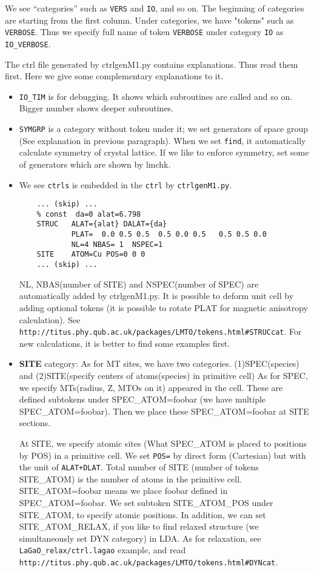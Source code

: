 \documentclass[a4paper,10pt,epsf,fleqn]{article}
\begin{document}
We see ``categories'' such as \verb+VERS+ and \verb+IO+, and so on.
The beginning of categories are starting from the first column.
Under categories, we have "tokens" such as \verb+VERBOSE+.
Thus we specify full name of token \verb+VERBOSE+ under category
\verb+IO+ as \verb+IO_VERBOSE+.

The ctrl file generated by ctrlgenM1.py contains explanations.
Thus read them first. Here we give some complementary explanations to it.

\begin{itemize}
\item
\verb+IO_TIM+ is for debugging. It shows which subroutines are
called and so on. Bigger number shows deeper subroutines.

\item
\verb+SYMGRP+ is a category without token under it; 
we set generators of space group (See explanation in previous paragraph).
When we set \verb+find+, it automatically calculate symmetry of crystal lattice.
If we like to enforce symmetry, set some of generators which are shown by lmchk.

\item
We see \verb+ctrls+ is embedded in the \verb+ctrl+ by \verb+ctrlgenM1.py+.
\begin{verbatim}
    ... (skip) ...
    % const  da=0 alat=6.798
    STRUC   ALAT={alat} DALAT={da}
            PLAT=  0.0 0.5 0.5  0.5 0.0 0.5   0.5 0.5 0.0
            NL=4 NBAS= 1  NSPEC=1
    SITE    ATOM=Cu POS=0 0 0
    ... (skip) ...
\end{verbatim}
NL, NBAS(number of SITE) and NSPEC(number of SPEC) are automatically
added by ctrlgenM1.py.
It is possible to deform unit cell by adding optional tokens
(it is possible to rotate PLAT for magnetic anisotropy calculation).
See \verb+http://titus.phy.qub.ac.uk/packages/LMTO/tokens.html#STRUCcat+.
For new calculations, it is better to find some examples first.

\item
{\bf SITE} category:
As for MT sites, we have two categories.
(1)SPEC(species) and (2)SITE(specify centers of atoms(species) in primitive cell)
As for SPEC, we specify MTs(radius, Z, MTOs on it) appeared in the cell.
These are defined subtokens under SPEC\_ATOM=foobar (we have multiple SPEC\_ATOM=foobar).
Then we place these SPEC\_ATOM=foobar at SITE sections.

At SITE, we specify atomic sites 
(What SPEC\_ATOM is placed to positions by POS) in a primitive cell.
We set \verb+POS=+ by direct form (Cartesian) but with the unit of \verb$ALAT+DLAT$.
Total number of SITE (number of tokens SITE\_ATOM) is
the number of atoms in the primitive cell.
SITE\_ATOM=foobar means we place foobar defined in SPEC\_ATOM=foobar.
We set subtoken SITE\_ATOM\_POS under SITE\_ATOM, to specify atomic positions.
In addition, we can set SITE\_ATOM\_RELAX, if you like to find relaxed
structure (we simultaneously set DYN category) in LDA. As for
relaxation, see \verb+LaGaO_relax/ctrl.lagao+
example, and read\\ \verb+http://titus.phy.qub.ac.uk/packages/LMTO/tokens.html#DYNcat+.\\


\end{itemize}
\end{document}

